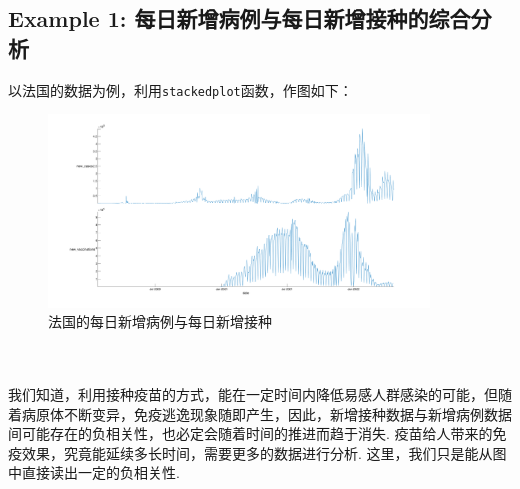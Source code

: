 \documentclass[a4paper, titlepage]{article}
\begin{document}
    \subsection{Example 1: 每日新增病例与每日新增接种的综合分析}
        以法国的数据为例，利用\texttt{stackedplot}函数，作图如下：\\
        \begin{minipage}{\textwidth}
            \begin{figure}[H]
                \centering
                \includegraphics[width=0.9\textwidth]{./images/France_CasesAndVaccinations.png}
                \vspace{-1.5em}
                \caption{法国的每日新增病例与每日新增接种}
                \label{images:France_CasesAndVaccinations}
            \end{figure}
        \end{minipage}\\\quad\\
        我们知道，利用接种疫苗的方式，能在一定时间内降低易感人群感染的可能，但随着病原体不断变异，免疫逃逸现象随即产生，因此，新增接种数据与新增病例数据间可能存在的负相关性，也必定会随着时间的推进而趋于消失. 疫苗给人带来的免疫效果，究竟能延续多长时间，需要更多的数据进行分析. 这里，我们只是能从图中直接读出一定的负相关性.
        
\end{document}
